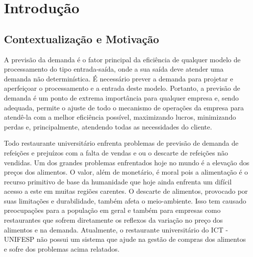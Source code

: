 \documentclass[	12pt, Times, openright, twoside, a4paper, english, brazil]{abntex2}
\begin{document}

    \tableofcontents*
    \cleardoublepage

  \textual

  \chapter{Introdução}
      \section{Contextualização e Motivação}

        \noindent 
        A previsão da demanda é o fator principal da eficiência de qualquer modelo de processamento do tipo entrada-saída, onde a sua saída deve atender uma demanda não determinística. É necessário prever a demanda para projetar e aperfeiçoar o processamento e a entrada deste modelo. 
        Portanto, a previsão de demanda é um ponto de extrema importância para qualquer empresa e, sendo adequada, permite o ajuste de todo o mecanismo de operações da empresa para atendê-la com a melhor eficiência possível, maximizando lucros, minimizando perdas e, principalmente, atendendo todas as necessidades do cliente.
        

        Todo restaurante universitário enfrenta problemas de previsão de demanda de refeições e prejuízos com a falta de vendas e ou o descarte de refeições não vendidas. Um dos grandes problemas enfrentados hoje no mundo é a elevação dos preços dos alimentos. O valor, além de monetário, é moral pois a alimentação é o recurso primitivo de base da humanidade que hoje ainda enfrenta um difícil acesso a este em muitas regiões carentes. O descarte de alimentos, provocado por suas limitações e durabilidade, também afeta o meio-ambiente. Isso tem causado preocupações para a população em geral e também para empresas como restaurantes que sofrem diretamente os reflexos da variação no preço dos alimentos e na demanda. Atualmente, o restaurante universitário do ICT - UNIFESP não possui um sistema que ajude na gestão de compras dos alimentos e sofre dos problemas acima relatados.
\end{document}
